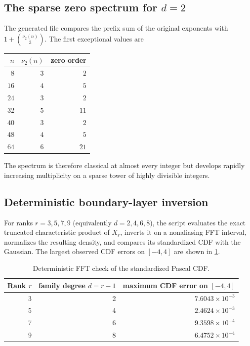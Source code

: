 \documentclass[11pt,oneside]{article}
\numberwithin{equation}{section}
\theoremstyle{definition}
\theoremstyle{remark}
\begin{document}
\subsection{The sparse zero spectrum for $d=2$}

The generated file  compares the prefix sum of the original
exponents with $1+\binom{\nu_2(n)}3$.  The first exceptional values are
\begin{center}
\begin{tabular}{@{}r r r@{}}
\toprule
$n$ & $\nu_2(n)$ & zero order\\
\midrule
$8$ & $3$ & $2$\\
$16$ & $4$ & $5$\\
$24$ & $3$ & $2$\\
$32$ & $5$ & $11$\\
$40$ & $3$ & $2$\\
$48$ & $4$ & $5$\\
$64$ & $6$ & $21$\\
\bottomrule
\end{tabular}
\end{center}
The spectrum is therefore classical at almost every integer but develops rapidly increasing
multiplicity on a sparse tower of highly divisible integers.

\subsection{Deterministic boundary-layer inversion}

For ranks $r=3,5,7,9$ (equivalently $d=2,4,6,8$), the script evaluates the exact truncated
characteristic product of $X_r$, inverts it on a nonaliasing FFT interval, normalizes the
resulting density, and compares its standardized CDF with the Gaussian.  The largest observed
CDF errors on $[-4,4]$ are shown in \cref{p1:tab:boundary-errors}.

\begin{table}[htbp]
\centering
\small
\caption{Deterministic FFT check of the standardized Pascal CDF.}
\label{p1:tab:boundary-errors}
\begin{tabular}{@{}r r r@{}}
\toprule
Rank $r$ & family degree $d=r-1$ & maximum CDF error on $[-4,4]$\\
\midrule
3 & 2 & $7.6043\times10^{-3}$\\
5 & 4 & $2.4624\times10^{-3}$\\
7 & 6 & $9.3598\times10^{-4}$\\
9 & 8 & $6.4752\times10^{-4}$\\
\bottomrule
\end{tabular}
\end{table}
\end{document}
